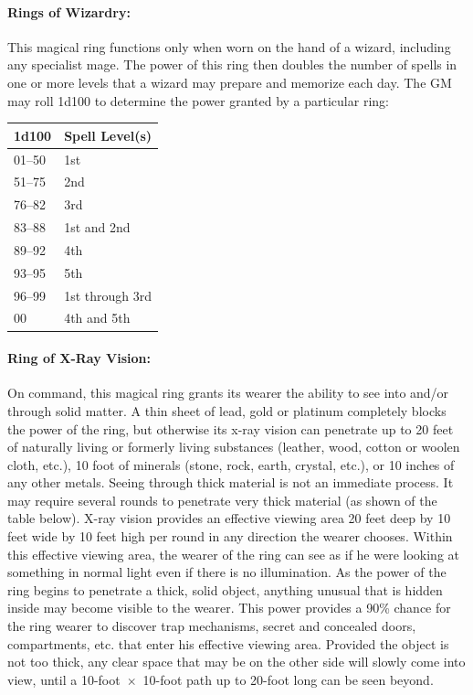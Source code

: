 \begin{multicols}{2}
\paragraph{Rings of Wizardry:} This magical ring functions only when worn on the hand of a wizard, including any specialist mage. The power of this ring then doubles the number of spells in one or more levels that a wizard may prepare and memorize each day.  The GM may roll 1d100 to determine the power granted by a particular ring:

\noindent
\begin{tabular}{|p{}|p{}|}
\hline
1d100	& Spell Level(s) \\
\hline\hline
\rowcolor[gray]{.9}01--50	& 1st \\
51--75	& 2nd \\
\rowcolor[gray]{.9}76--82	& 3rd \\
83--88	& 1st and 2nd \\
\rowcolor[gray]{.9}89--92	& 4th \\
93--95	& 5th \\
\rowcolor[gray]{.9}96--99	& 1st through 3rd \\
00	& 4th and 5th \\
\hline
\end{tabular}

\paragraph{Ring of X-Ray Vision:} On command, this magical ring grants its wearer the ability to see into and/or through solid matter.  A thin sheet of lead, gold or platinum completely blocks the power of the ring, but otherwise its x-ray vision can penetrate up to 20 feet of naturally living or formerly living substances (leather, wood, cotton or woolen cloth, etc.), 10 foot of minerals (stone, rock, earth, crystal, etc.), or 10 inches of any other metals.  Seeing through thick material is not an immediate process.  It may require several rounds to penetrate very thick material (as shown of the table below).  X-ray vision provides an effective viewing area 20 feet deep by 10 feet wide by 10 feet high per round in any direction the wearer chooses.  Within this effective viewing area, the wearer of the ring can see as if he were looking at something in normal light even if there is no illumination.  As the power of the ring begins to penetrate a thick, solid object, anything unusual that is hidden inside may become visible to the wearer.  This power provides a 90\% chance for the ring wearer to discover trap mechanisms, secret and concealed doors, compartments, etc. that enter his effective viewing area.  Provided the object is not too thick, any clear space that may be on the other side will slowly come into view, until a 10-foot~$\times$~10-foot path up to 20-foot long can be seen beyond.
 

\end{multicols}
